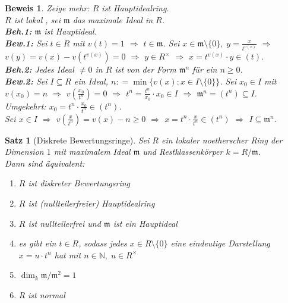 \documentclass[a4paper,12pt]{scrbook}
\theoremstyle{break}
\newtheorem{Satz}{Satz}
\theoremstyle{nonumberbreak}
\newtheorem{Bew}{Beweis}
\theoremstyle{nonumberplain}
\newcommand{\defeqr}[0]{\mathrel{\mathop:}=}
\begin{document}
\begin{Bew}
Zeige mehr: $R$ ist Hauptidealring.\\
$R$ ist lokal \checkmark, sei $\mathfrak{m}$ das maximale Ideal in $R$.\\
\textbf{Beh.1:} $\mathfrak{m}$ ist Hauptideal.\\
\textbf{Bew.1:} Sei $t \in R$ mit $v(t)=1$ $\Rightarrow$ $t \in \mathfrak{m}$. Sei $x \in \mathfrak{m}
\setminus\{0\},\; y = \frac{x}{t^{v(x)}}$ $\Rightarrow$ $v(y) = v(x) - v(t^{v(x)}) = 0$
$\Rightarrow$ $y \in R^{\times}$ $\Rightarrow$ $x = t^{v(x)} \cdot y \in (t)$.\\
\textbf{Beh.2:} Jedes Ideal $\not= 0$ in $R$ ist von der Form $\mathfrak{m}^n$ für ein $n
\geq 0$.\\
\textbf{Bew.2:} Sei $I \subseteq R$ ein Ideal, $n \defeqr \min\{v(x): x \in I
\setminus\{0\}\}$. Sei $x_0 \in I$ mit $v(x_0) = n$ $\Rightarrow$
$v(\frac{x_0}{t^n})=0$ $\Rightarrow$ $t^n = \frac{t^n}{x_0} \cdot x_0 \in I$
$\Rightarrow$ $\mathfrak{m}^n = (t^n) \subseteq I$.\\
Umgekehrt: $x_0 = t^n \cdot \frac{x_0}{t^n} \in (t^n)$.\\
Sei $x \in I$ $\Rightarrow$ $v(\frac{x}{t^n})=v(x)-n \geq 0$ $\Rightarrow$ $x = t^n \cdot \frac{x}{t^n}\in (t^n)$ $\Rightarrow$ $I \subseteq \mathfrak{m}^n$.
\end{Bew}

\begin{Satz}[Diskrete Bewertungsringe]
\label{Satz12}
Sei $R$ ein lokaler noetherscher Ring der Dimension $1$ mit maximalem Ideal
$\mathfrak{m}$ und Restklassenkörper $k = R/\mathfrak{m}$.\\
Dann sind äquivalent:
\begin{enumerate}
  \item[(i)] $R$ ist diskreter Bewertungsring
  \item[(ii)] $R$ ist (nullteilerfreier) Hauptidealring
  \item[(iii)] $R$ ist nullteilerfrei und $\mathfrak{m}$ ist ein Hauptideal
  \item[(iv)] es gibt ein $t \in R$, sodass jedes $x \in R \setminus \{0\}$ eine
  eindeutige Darstellung $x=u \cdot t^n$ hat mit $n \in \mathbb{N}, \; u \in
  R^{\times}$
  \item[(v)] $\dim_k \mathfrak{m}/\mathfrak{m}^2 = 1$
  \item[(vi)] R ist normal
\end{enumerate}
\end{Satz}
\end{document}
